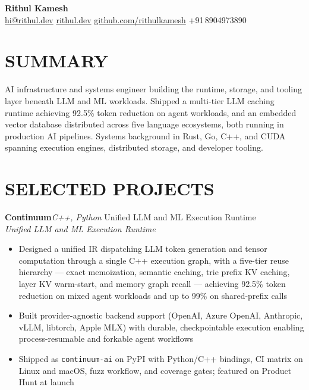 \documentclass[letterpaper,11pt]{article}
\newcommand{\entry}[4]{%
  \par\vspace{5pt}
  \noindent\textbf{#1}\hfill\textit{#2}%
  \ifx\relax#3\relax\else%
    \\[-1pt]\textit{#3}\hfill\textit{#4}%
  \fi%
  \par\vspace{1pt}%
}
\begin{document}
\begin{center}
  {\LARGE\bfseries Rithul Kamesh}\\[5pt]
  \small
  \href{mailto:hi@rithul.dev}{hi@rithul.dev}\enspace\textbar\enspace
  \href{https://rithul.dev}{rithul.dev}\enspace\textbar\enspace
  \href{https://github.com/rithulkamesh}{github.com/rithulkamesh}\enspace\textbar\enspace
  +91\,8904973890
\end{center}

\vspace{2pt}

\section{SUMMARY}

\noindent
AI infrastructure and systems engineer building the runtime, storage, and tooling
layer beneath LLM and ML workloads. Shipped a multi-tier LLM caching runtime
achieving 92.5\% token reduction on agent workloads, and an embedded vector
database distributed across five language ecosystems, both running in production
AI pipelines. Systems background in Rust, Go, C++, and CUDA spanning execution
engines, distributed storage, and developer tooling.

\section{SELECTED PROJECTS}

\entry{Continuum}{C++, Python}
{Unified LLM and ML Execution Runtime}{}
\begin{itemize}
  \item Designed a unified IR dispatching LLM token generation and tensor computation
        through a single C++ execution graph, with a five-tier reuse hierarchy --- exact
        memoization, semantic caching, trie prefix KV caching, layer KV warm-start, and
        memory graph recall --- achieving 92.5\% token reduction on mixed agent workloads
        and up to 99\% on shared-prefix calls
  \item Built provider-agnostic backend support (OpenAI, Azure OpenAI, Anthropic, vLLM,
        libtorch, Apple MLX) with durable, checkpointable execution enabling
        process-resumable and forkable agent workflows
  \item Shipped as \texttt{continuum-ai} on PyPI with Python/C++ bindings, CI matrix
        on Linux and macOS, fuzz workflow, and coverage gates; featured on Product Hunt
        at launch
\end{itemize}
\end{document}
